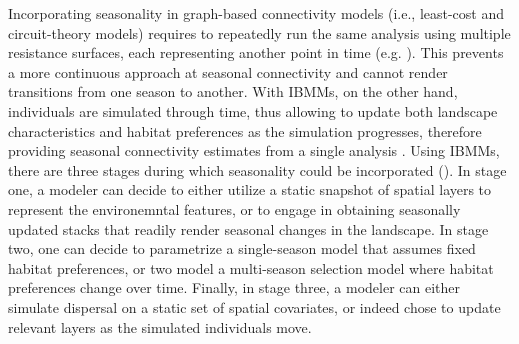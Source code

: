 \documentclass[abstract=on,10pt,a4paper,bibliography=totocnumbered]{article}
\begin{document}
Incorporating seasonality in graph-based connectivity models (i.e., least-cost
and circuit-theory models) requires to repeatedly run the same analysis using
multiple resistance surfaces, each representing another point in time (e.g.
\citealp{Chetkiewicz.2009, Cushman.2010, Osipova.2019, Zeller.2020, Kaszta.2021,
Ciudad.2021}). This prevents a more continuous approach at seasonal connectivity
and cannot render transitions from one season to another. With IBMMs, on the
other hand, individuals are simulated through time, thus allowing to update both
landscape characteristics and habitat preferences as the simulation progresses,
therefore providing seasonal connectivity estimates from a single analysis
\citep{Zeller.2020}. Using IBMMs, there are three stages during which
seasonality could be incorporated (). In stage one, a
modeler can decide to either utilize a static snapshot of spatial layers to
represent the environemntal features, or to engage in obtaining seasonally
updated stacks that readily render seasonal changes in the landscape. In stage
two, one can decide to parametrize a single-season model that assumes fixed
habitat preferences, or two model a multi-season selection model where habitat
preferences change over time. Finally, in stage three, a modeler can either
simulate dispersal on a static set of spatial covariates, or indeed chose to
update relevant layers as the simulated individuals move.
\end{document}
